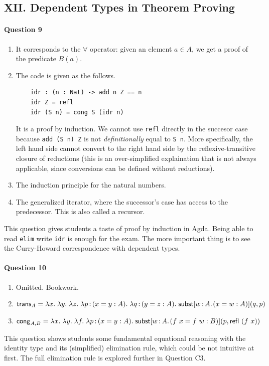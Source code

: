 \documentclass[11pt,a4paper,twoside]{article}
\begin{document}
\subsection*{XII. Dependent Types in Theorem Proving}

\paragraph*{Question 9}
\begin{enumerate}[label=(\alph*)]
  \item It corresponds to the $\forall$ operator: given an element $a \in A$, 
    we get a proof of the predicate $B(a)$.
  \item The code is given as the follows.
  \begin{lstlisting}
    idr : (n : Nat) -> add n Z == n
    idr Z = refl
    idr (S n) = cong S (idr n)
  \end{lstlisting}
  It is a proof by induction. We cannot use \lstinline|refl| directly in the succesor
  case because \lstinline|add (S n) Z| is not \emph{definitionally} equal to \lstinline|S n|.
  More specifically, the left hand side cannot convert to the right hand side
  by the reflexive-transitive closure of reductions (this is an over-simplified explaination
  that is not always applicable, since conversions can be defined without reductions).
  \item The induction principle for the natural numbers.
  \item The generalized iterator, where the successor's case has access
    to the predecessor. This is also called a recursor.
\end{enumerate}
%
This question gives students a taste of proof by induction in Agda.
Being able to read \lstinline|elim| write \lstinline|idr| is enough for the exam. 
The more important thing is to see the Curry-Howard correspondence 
with dependent types.

\paragraph*{Question 10}
\begin{enumerate}[label=(\alph*)]
  \item Omitted. Bookwork.
  \item $\mathsf{trans}_A = \lambda x.\; \lambda y.\; \lambda z.\; 
    \lambda p \,{:}\, (x = y : A) .\; 
      \lambda q \,{:}\, (y = z : A) .\; 
        \mathsf{subst}[w \,{:}\, A .\;\! (x = w : A)](q, p)
     $
  \item $\mathsf{cong}_{A,B} = \lambda x.\; \lambda y.\; \lambda f.\; 
    \lambda p \,{:}\, (x = y : A) .\; 
        \mathsf{subst}[w \,{:}\, A .\;\! (f\ x = f\ w : B)](p, \mathsf{refl}\ (f\ x))
     $
\end{enumerate}
%
This question shows students some fundamental equational reasoning with
the identity type and its (simplified) elimination rule, which could be
not intuitive at first. The full elimination rule is explored further
in Question C3.
\end{document}
